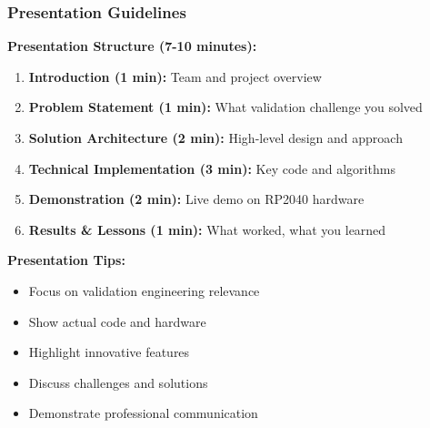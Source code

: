 \documentclass{beamer}
\begin{document}
\begin{frame}
\frametitle{Presentation Guidelines}
\textbf{Presentation Structure (7-10 minutes):}
\begin{enumerate}
    \item \textbf{Introduction (1 min):} Team and project overview
    \item \textbf{Problem Statement (1 min):} What validation challenge you solved
    \item \textbf{Solution Architecture (2 min):} High-level design and approach
    \item \textbf{Technical Implementation (3 min):} Key code and algorithms
    \item \textbf{Demonstration (2 min):} Live demo on RP2040 hardware
    \item \textbf{Results \& Lessons (1 min):} What worked, what you learned
\end{enumerate}

\vspace{0.5cm}
\textbf{Presentation Tips:}
\begin{itemize}
    \item Focus on validation engineering relevance
    \item Show actual code and hardware
    \item Highlight innovative features
    \item Discuss challenges and solutions
    \item Demonstrate professional communication
\end{itemize}
\end{frame}
\end{document}
